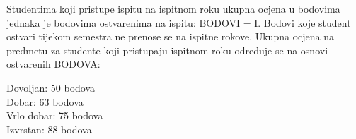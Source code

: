 \documentclass[times, 12pt, utf8]{book}
\newenvironment{myindentpar}[1]%
{\begin{list}{}%
         {\setlength{\leftmargin}{#1}}%
         \item[]%
}
{\end{list}}
\begin{document}
Studentima koji pristupe ispitu na ispitnom roku ukupna ocjena u bodovima jednaka je bodovima ostvarenima na ispitu: BODOVI = I.
Bodovi koje student ostvari tijekom semestra ne prenose se na ispitne rokove.
Ukupna ocjena na predmetu za studente koji pristupaju ispitnom roku određuje se na osnovi ostvarenih BODOVA:
\begin{myindentpar}{30pt}
Dovoljan: 50 bodova \\
Dobar: 63 bodova \\
Vrlo dobar: 75 bodova \\
Izvrstan: 88 bodova 
\end{myindentpar}
\end{document}
